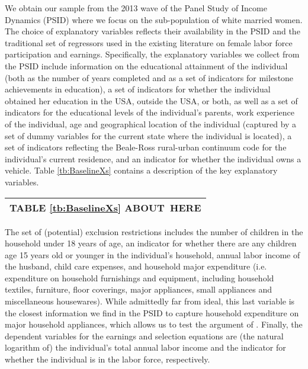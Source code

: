 \documentclass[11pt]{article}
\begin{document}
We obtain our sample from the 2013 wave of the Panel Study of Income Dynamics
(PSID) where we %
focus on the sub-population of
white married women. %
The choice of explanatory variables %
reflects their availability in the PSID and %
the traditional set of regressors %
used in the existing literature on
female labor force participation and earnings. Specifically, the explanatory
variables we collect from the PSID include information on the educational
attainment of the individual (both as the number of years completed and as a
set of indicators for milestone achievements in education), a set of indicators
for whether the individual obtained her education in the USA, outside the USA,
or both, as well as a set of indicators for the educational levels of the
individual's parents, work experience of the individual, age and geographical
location of the individual (captured by a set of dummy variables for the current
state where the individual is located), a set of indicators reflecting the
Beale-Ross rural-urban continuum code for the individual's current residence,
and an indicator for whether the individual owns a vehicle. Table \ref{tb:BaselineXs} contains a description of the key explanatory variables.




\begin{center}
\begin{tabular}
[c]{l}\hline\hline
TABLE \ref{tb:BaselineXs} ABOUT\ HERE\\\hline\hline
\end{tabular}
\end{center}

The set of (potential) exclusion restrictions includes the number of children in
the household under 18 years of age, an indicator for whether there are any
children age 15 years old or younger in the individual's household, annual labor
income of the husband, child care expenses, and household major
expenditure (i.e. expenditure on household furnishings and equipment, including
household textiles, furniture, floor coverings, major appliances, small
appliances and miscellaneous housewares). %
While admittedly far from ideal, this last variable is the closest information
we find in the PSID to capture household expenditure on major household
appliances, which allows us to test the argument of \cite{cavalcanti:08}. Finally, the dependent variables for the earnings and selection
equations are (the natural logarithm of) the individual's total annual labor
income and the indicator for whether the individual is in the labor force,
respectively.
\end{document}
